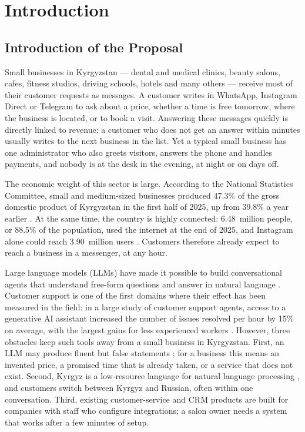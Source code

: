 
\chapter{Introduction} %

\label{Chapter1} %


\section{Introduction of the Proposal}

Small businesses in Kyrgyzstan --- dental and medical clinics, beauty salons, cafes, fitness studios, driving schools,
hotels and many others --- receive most of their customer requests as messages. A customer writes in WhatsApp,
Instagram Direct or Telegram to ask about a price, whether a time is free tomorrow, where the business is located, or to
book a visit. Answering these messages quickly is directly linked to revenue: a customer who does not get an answer
within minutes usually writes to the next business in the list. Yet a typical small business has one administrator who
also greets visitors, answers the phone and handles payments, and nobody is at the desk in the evening, at night or on
days off.

The economic weight of this sector is large. According to the National Statistics Committee, small and medium-sized
businesses produced 47.3\% of the gross domestic product of Kyrgyzstan in the first half of 2025, up from 39.8\% a year
earlier \parencite{akchabar2025sme}. At the same time, the country is highly connected: 6.48~million people, or 88.5\%
of the population, used the internet at the end of 2025, and Instagram alone could reach 3.90~million users
\parencite{datareportal2026kg}. Customers therefore already expect to reach a business in a messenger, at any hour.

Large language models (LLMs) have made it possible to build conversational agents that understand free-form questions
and answer in natural language \parencite{brown2020language}. Customer support is one of the first domains where
their effect has been measured in the field: in a large study of customer support agents, access to a generative AI
assistant increased the number of issues resolved per hour by 15\% on average, with the largest gains for less
experienced workers \parencite{brynjolfsson2025generative}. However, three obstacles keep such tools away from a small
business in Kyrgyzstan. First, an LLM may produce fluent but false statements \parencite{ji2023survey}; for a business
this means an invented price, a promised time that is already taken, or a service that does not exist. Second, Kyrgyz is
a low-resource language for natural language processing \parencite{joshi2020state, alekseev2024kyrgyznlp}, and
customers switch between Kyrgyz and Russian, often within one conversation. Third, existing customer-service and CRM
products are built for companies with staff who configure integrations; a salon owner needs a system that works after a
few minutes of setup.

